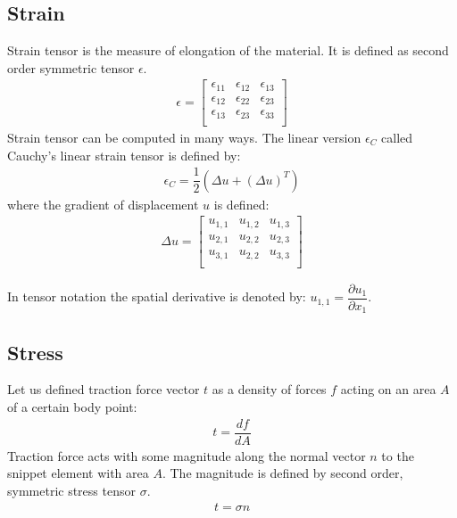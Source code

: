 \documentclass[en]{minipw} %
\begin{document}
\subsection{Strain}
Strain tensor is the measure of elongation of the material. It is defined as second order symmetric tensor $\epsilon$.
\begin{equation}
\begin{aligned}
\epsilon =
\begin{bmatrix}
\epsilon_{11} & \epsilon_{12} & \epsilon_{13} \\
\epsilon_{12} & \epsilon_{22} & \epsilon_{23} \\
\epsilon_{13} & \epsilon_{23} & \epsilon_{33} \\
\end{bmatrix}
\end{aligned}
\end{equation}
Strain tensor can be computed in many ways. The linear version $\epsilon_C$ called Cauchy's linear strain tensor is defined by:
\begin{equation}
\begin{aligned}
\epsilon_C = \dfrac{1}{2}(\Delta u + (\Delta u)^{T})
\end{aligned}
\end{equation}
where the gradient of displacement $u$ is defined:
\begin{equation}
\begin{aligned}
\Delta u =
\begin{bmatrix}
u_{1,1} & u_{1,2} & u_{1,3} \\
u_{2,1} & u_{2,2} & u_{2,3} \\
u_{3,1} & u_{2,2} & u_{3,3} \\
\end{bmatrix}
\end{aligned}
\end{equation}

In tensor notation the spatial derivative is denoted by: $u_{1,1} = \dfrac{\partial u_1}{\partial x_1}$.

\subsection{Stress}
Let us defined traction force vector $t$ as a density of forces $f$ acting on an area $A$ of a certain body point:
\begin{equation}
\begin{aligned}
t = \dfrac{df}{dA}
\end{aligned}
\end{equation}
Traction force acts with some magnitude along the normal vector $n$ to the snippet element with area $A$. The magnitude is defined by second order, symmetric stress tensor $\sigma$.
\begin{equation}
\begin{aligned}
t = \sigma n
\end{aligned}
\end{equation}
\end{document}
